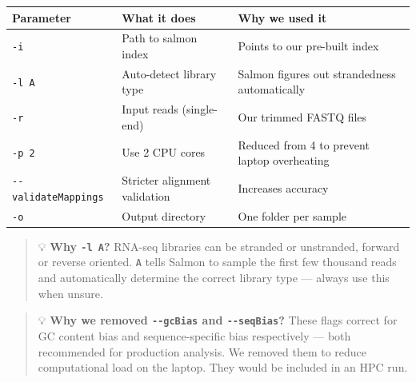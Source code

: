 \documentclass[
]{article}
\begin{document}
\begin{longtable}[]{@{}
  >{\raggedright\arraybackslash}p{}
  >{\raggedright\arraybackslash}p{}
  >{\raggedright\arraybackslash}p{}@{}}
\toprule\noalign{}
\begin{minipage}[b]{\linewidth}\raggedright
Parameter
\end{minipage} & \begin{minipage}[b]{\linewidth}\raggedright
What it does
\end{minipage} & \begin{minipage}[b]{\linewidth}\raggedright
Why we used it
\end{minipage} \\
\midrule\noalign{}
\endhead
\bottomrule\noalign{}
\endlastfoot
\texttt{-i} & Path to salmon index & Points to our pre-built index \\
\texttt{-l\ A} & Auto-detect library type & Salmon figures out
strandedness automatically \\
\texttt{-r} & Input reads (single-end) & Our trimmed FASTQ files \\
\texttt{-p\ 2} & Use 2 CPU cores & Reduced from 4 to prevent laptop
overheating \\
\texttt{-\/-validateMappings} & Stricter alignment validation &
Increases accuracy \\
\texttt{-o} & Output directory & One folder per sample \\
\end{longtable}

\begin{quote}
💡 \textbf{Why \texttt{-l\ A}?} RNA-seq libraries can be stranded or
unstranded, forward or reverse oriented. \texttt{A} tells Salmon to
sample the first few thousand reads and automatically determine the
correct library type --- always use this when unsure.
\end{quote}

\begin{quote}
💡 \textbf{Why we removed \texttt{-\/-gcBias} and \texttt{-\/-seqBias}?}
These flags correct for GC content bias and sequence-specific bias
respectively --- both recommended for production analysis. We removed
them to reduce computational load on the laptop. They would be included
in an HPC run.
\end{quote}
\end{document}
